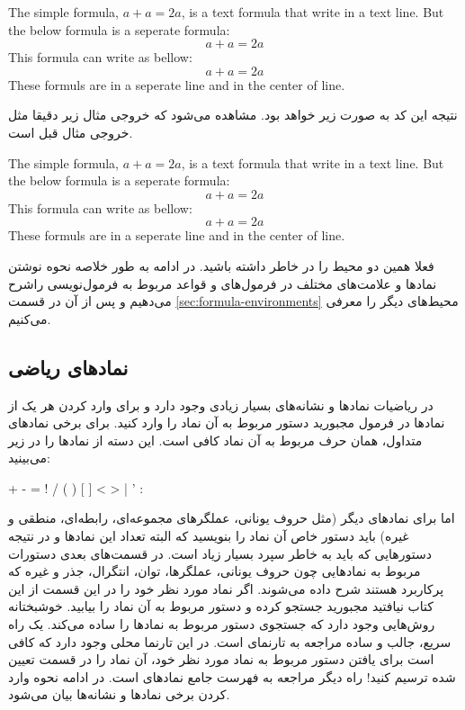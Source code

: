\begin{latex}
The simple formula, $a+a=2a$, is a text formula that write
in a text line. But the below formula is a seperate formula:
\[
a+a=2a
\]
This formula can write as bellow:
\[
a+a=2a
\]
These formuls are in a seperate line and in the center of line.
\end{latex}

نتیجه این کد \lr{\LaTeX} به صورت زیر خواهد بود. مشاهده می‌شود که خروجی مثال زیر
دقیقا مثل خروجی مثال قبل است.

\begin{latin}
The simple formula, $a+a=2a$, is a text formula that write
in a text line. But the below formula is a seperate formula:
\[
a+a=2a
\]
This formula can write as bellow:
\[
a+a=2a
\]
These formuls are in a seperate line and in the center of line.
\end{latin}

فعلا همین دو محیط را در خاطر داشته باشید. در ادامه به طور خلاصه نحوه نوشتن
نمادها و علامت‌های مختلف در فرمول‌‌های \lr{\LaTeX} و قواعد مربوط به فرمول‌نویسی
راشرح می‌دهیم و پس از آن در قسمت \ref{sec:formula-environments} محیط‌های دیگر را
معرفی می‌کنیم.

\subsection{نمادهای ریاضی}
در ریاضیات نمادها و نشانه‌های بسیار زیادی وجود دارد و برای وارد کردن هر یک از
نمادها در فرمول مجبورید دستور مربوط به آن نماد را وارد کنید. برای برخی نمادهای
متداول، همان حرف مربوط به آن نماد کافی است. این دسته از نمادها را در زیر
می‌بینید:
\begin{latex}
+ - = ! / ( ) [ ] < > | ' :
\end{latex} 
اما برای نمادهای دیگر (مثل حروف یونانی، عملگرهای مجموعه‌ای، رابطه‌ای، منطقی و
غیره) باید دستور خاص آن نماد را بنویسید که البته تعداد این نمادها و در نتیجه
دستورهایی که باید به خاطر سپرد بسیار زیاد است. در قسمت‌های بعدی دستورات مربوط به
نمادهایی چون حروف یونانی، عملگرها، توان، انتگرال، جذر و غیره که پرکاربرد هستند
شرح داده می‌شوند. اگر نماد مورد نظر خود را در این قسمت از این کتاب نیافتید
مجبورید جستجو کرده و دستور مربوط به آن نماد را بیابید. خوشبختانه روش‌هایی وجود
دارد که جستجوی دستور مربوط به نمادها را ساده می‌کند. یک راه سریع، جالب و ساده
مراجعه به تارنمای  است. در این تارنما محلی
وجود دارد که کافی است برای یافتن دستور مربوط به نماد مورد نظر خود، آن نماد را در
قسمت تعیین شده ترسیم کنید! راه دیگر مراجعه به فهرست جامع نمادهای
\lr{\LaTeX}
است.
در ادامه نحوه وارد کردن برخی نمادها و نشانه‌ها بیان می‌شود.

